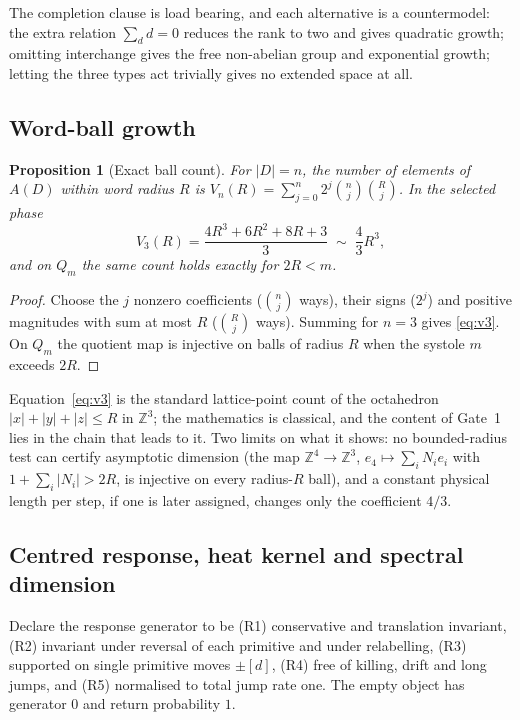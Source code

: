 \documentclass[11pt]{article}
\newtheorem{proposition}[theorem]{Proposition}
\theoremstyle{definition}
\theoremstyle{remark}
\newcommand{\Z}{\mathbb{Z}}
\begin{document}
The completion clause is load bearing, and each alternative is a countermodel:
the extra relation $\sum_{d}d=0$ reduces the rank to two and gives quadratic growth;
omitting interchange gives the free non-abelian group and exponential growth; letting the
three types act trivially gives no extended space at all.

\subsection{Word-ball growth}
\label{sec:volume}

\begin{proposition}[Exact ball count]
\label{prop:volume}
For $|D|=n$, the number of elements of $A(D)$ within word radius $R$ is
$V_n(R)=\sum_{j=0}^{n}2^j\binom nj\binom Rj$. In the selected phase
\begin{equation}
V_3(R)=\frac{4R^3+6R^2+8R+3}{3}\;\sim\;\frac43R^3 ,
\label{eq:v3}
\end{equation}
and on $Q_m$ the same count holds exactly for $2R<m$.
\end{proposition}

\begin{proof}
Choose the $j$ nonzero coefficients ($\binom nj$ ways), their signs ($2^j$) and positive
magnitudes with sum at most $R$ ($\binom Rj$ ways). Summing for $n=3$ gives
\eqref{eq:v3}. On $Q_m$ the quotient map is injective on balls of radius $R$ when the
systole $m$ exceeds $2R$.
\end{proof}

Equation~\eqref{eq:v3} is the standard lattice-point count of the octahedron
$|x|+|y|+|z|\le R$ in $\Z^3$; the mathematics is classical, and the content of
Gate~1 lies in the chain that leads to it. Two limits on what it shows: no bounded-radius
test can certify asymptotic dimension (the map $\Z^4\to\Z^3$,
$e_4\mapsto\sum_iN_ie_i$ with $1+\sum_i|N_i|>2R$, is injective on every radius-$R$ ball),
and a constant physical length per step, if one is later assigned, changes only the
coefficient $4/3$.

\subsection{Centred response, heat kernel and spectral dimension}
\label{sec:heat}

Declare the response generator to be (R1) conservative and translation invariant,
(R2) invariant under reversal of each primitive and under relabelling, (R3) supported on
single primitive moves $\pm[d]$, (R4) free of killing, drift and long jumps, and (R5)
normalised to total jump rate one. The empty object has generator $0$ and return
probability $1$.
\end{document}

